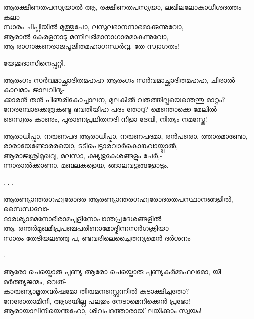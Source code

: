 \begin{enumerate}



\begin{slokam}{\VSv}{\UN}{ആരക്ഷീണതപസ്യയാൽ}
ആ, രക്ഷീണതപസ്യയാ, ലഖിലലോകാധീശദത്തം കലാ--\\
സാരം ചിപ്പിയിൽ മുത്തുപോ, ലസുലഭാനന്ദാഭമാക്കുന്നുവോ,\\
ആരാൽ കേരളനാടു മന്നിലഭിമാനാഗാരമാകുന്നുവോ,\\
ആ രാഗാങ്കണരാജപൂജിതമഹാഗന്ധർവ്വ, തേ സ്വാഗതം!
\end{slokam}


യേശുദാസിനെപ്പറ്റി.

\begin{slokam}{\VSr}{\VNM}{ആരംഗം സർവമാച്ഛാദിതമഹഹ}
ആരംഗം സർവമാച്ഛാദിതമഹഹ, ചിരാൽ കാലമാം ജാലവിദ്യ-\\
ക്കാരൻ തൻ പിഞ്ഛികോച്ചാലന, മുലകിൽ വരുത്തില്ലയെന്തെന്തു മാറ്റം?\\
നേരമ്പോക്കെത്രകണ്ടൂ ഭവതിയിഹ പദം തോറു? മെന്തൊക്കെ മേലിൽ\\
സ്വൈരം കാണും, പുരാണപ്രഥിതനദി നിളാ ദേവി, നിത്യം നമസ്തേ!
\end{slokam}



\begin{slokam}{\VMk}{\MPN}{ആരാധിപ്പാ, നരുണപദ}
ആരാധിപ്പാ, നരുണപദമാ, രൻപരൊ, ത്താരമാണ്ടോ,-\\
രാരായേണ്ടോരരയൊ, ടടിപെട്ടാരവാർകൊങ്കവായ്പ്പാൽ,\\
ആരാജശ്രീമുഖവു, മലസാ, ക്ഷ്യഭ്രകേശങ്ങളും ചേർ,-\\
ന്നാരാൽക്കാണാ, മബലകളെയ, ങ്ങാലവട്ടങ്ങളോടും.
\end{slokam}



.
. 
.


\begin{slokam}{\VSv}{\VRV}{ആരണ്യാന്തരഗഹ്വരോദര}
ആരണ്യാന്തരഗഹ്വരോദരതപസ്ഥാനങ്ങളിൽ, സൈന്ധവോ-\\
ദാരശ്യാമമനോഭിരാമപുളിനോപാന്തപ്രദേശങ്ങളിൽ\\
ആ, രന്തർമുഖമിപ്രപഞ്ചപരിണാമോദ്ഭിന്നസർഗക്രിയാ-\\
സാരം തേടിയലഞ്ഞു പ, ണ്ടവരിലെച്ചൈതന്യമെൻ ദർശനം
\end{slokam}


.

\begin{slokam}{\VSv}{\Unk}{ആരോ ചെയ്തൊരു പുണ്യ}
ആരോ ചെയ്തൊരു പുണ്യകർമ്മഫലമോ, യീ മർത്ത്യജന്മം, ഭവത്- \\
കാരുണ്യാമൃതവർഷമോ തിരുമനസ്സെന്നിൽ കടാക്ഷിച്ചതോ? \\
നേരോതാമിനി, ആശയില്ല പലതും നേടാമെനിക്കെൻ പ്രഭോ!\\
ആരായാലിനിയെന്തഹോ, ശിവപദത്താരായ് ലയിക്കാം സ്വയം!
\end{slokam} 
 

\end{enumerate}
